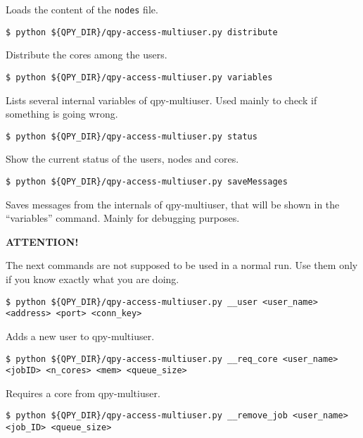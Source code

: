 \documentclass[a4paper,12pt]{article}
\begin{document}
Loads the content of the \texttt{nodes} file.

\begin{lstlisting}[style=BashStyle]
$ python ${QPY_DIR}/qpy-access-multiuser.py distribute
\end{lstlisting}

Distribute the cores among the users.

\begin{lstlisting}[style=BashStyle]
$ python ${QPY_DIR}/qpy-access-multiuser.py variables
\end{lstlisting}

Lists several internal variables of qpy-multiuser.
Used mainly to check if something is going wrong.

\begin{lstlisting}[style=BashStyle]
$ python ${QPY_DIR}/qpy-access-multiuser.py status
\end{lstlisting}

Show the current status of the users, nodes and cores.

\begin{lstlisting}[style=BashStyle]
$ python ${QPY_DIR}/qpy-access-multiuser.py saveMessages
\end{lstlisting}

Saves messages from the internals of qpy-multiuser, that will be shown in the ``variables'' command.
Mainly for debugging purposes.

\textbf{ATTENTION!}

The next commands are not supposed to be used in a normal run.
Use them only if you know exactly what you are doing.

\begin{lstlisting}[style=BashStyle]
$ python ${QPY_DIR}/qpy-access-multiuser.py __user <user_name> <address> <port> <conn_key>
\end{lstlisting}

Adds a new user to qpy-multiuser.

\begin{lstlisting}[style=BashStyle]
$ python ${QPY_DIR}/qpy-access-multiuser.py __req_core <user_name> <jobID> <n_cores> <mem> <queue_size>
\end{lstlisting}

Requires a core from qpy-multiuser.

\begin{lstlisting}[style=BashStyle]
$ python ${QPY_DIR}/qpy-access-multiuser.py __remove_job <user_name> <job_ID> <queue_size>
\end{lstlisting}
\end{document}
